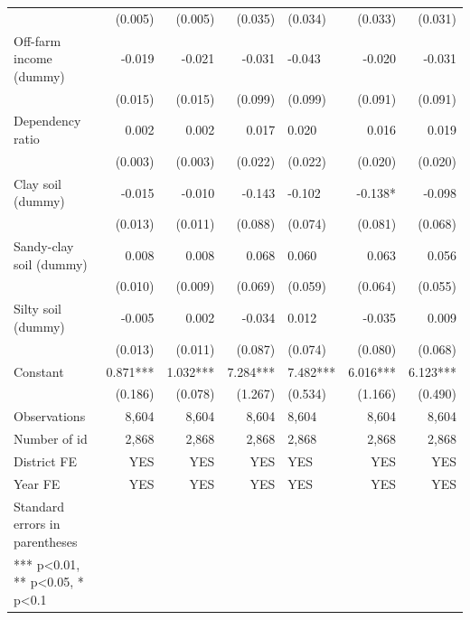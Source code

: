 \documentclass[
]{article}
\begin{document}
\begin{landscape}
\begin{longtable}[t]{lrrrlrr}
 & (0.005) & (0.005) & (0.035) & (0.034) & (0.033) & (0.031)\\
Off-farm income (dummy) & -0.019 & -0.021 & -0.031 & -0.043 & -0.020 & -0.031\\
 & (0.015) & (0.015) & (0.099) & (0.099) & (0.091) & (0.091)\\
Dependency ratio & 0.002 & 0.002 & 0.017 & 0.020 & 0.016 & 0.019\\
 & (0.003) & (0.003) & (0.022) & (0.022) & (0.020) & (0.020)\\
Clay soil (dummy) & -0.015 & -0.010 & -0.143 & -0.102 & -0.138* & -0.098\\
 & (0.013) & (0.011) & (0.088) & (0.074) & (0.081) & (0.068)\\
Sandy-clay soil (dummy) & 0.008 & 0.008 & 0.068 & 0.060 & 0.063 & 0.056\\
 & (0.010) & (0.009) & (0.069) & (0.059) & (0.064) & (0.055)\\
Silty soil (dummy) & -0.005 & 0.002 & -0.034 & 0.012 & -0.035 & 0.009\\
 & (0.013) & (0.011) & (0.087) & (0.074) & (0.080) & (0.068)\\
Constant & 0.871*** & 1.032*** & 7.284*** & 7.482*** & 6.016*** & 6.123***\\
 & (0.186) & (0.078) & (1.267) & (0.534) & (1.166) & (0.490)\\
Observations & 8,604 & 8,604 & 8,604 & 8,604 & 8,604 & 8,604\\
Number of id & 2,868 & 2,868 & 2,868 & 2,868 & 2,868 & 2,868\\
District FE & YES & YES & YES & YES & YES & YES\\
Year FE & YES & YES & YES & YES & YES & YES\\
Standard errors in parentheses &  &  &  &  &  & \\
*** p<0.01, ** p<0.05, * p<0.1 &  &  &  &  &  & \\*
\end{longtable}
\endgroup{}
\end{landscape}
\newpage
\end{document}
